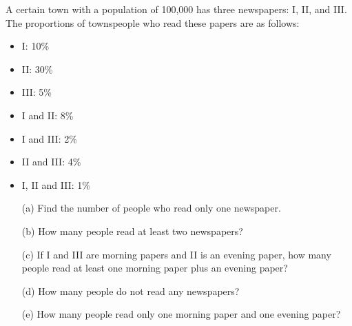         \begin{exercise}
        A certain town with a population of 100,000 has three newspapers: I, II, and III. The proportions of townspeople who read these papers are as follows:
        \begin{itemize}
            \item I: 10\%
            \item II: 30\%
            \item III: 5\%
            \item I and II: 8\%
            \item I and III: 2\%
            \item II and III: 4\%
            \item I, II and III: 1\%
        \end{itemize}
        \begin{enumerate}
            \item[(a)] Find the number of people who read only one newspaper.
            \item[(b)] How many people read at least two newspapers?
            \item[(c)] If I and III are morning papers and II is an evening
            paper, how many people read at least one morning paper
            plus an evening paper?
            \item[(d)] How many people do not read any newspapers?
            \item[(e)] How many people read only one morning paper and
            one evening paper?
        \end{enumerate}
        \end{exercise}
